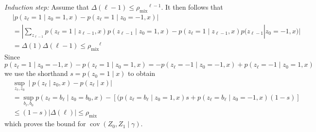 \documentclass[twoside,11pt]{article}
\DeclareMathOperator{\cov}{cov}
\newcommand{\mixcoef}{\ensuremath{\rho_{\mathrm{mix}}}}
\newcommand{\paramgamma}{\gamma}
\newcommand{\condcov}[3]{\cov(#1, #2 \mid #3)}
\begin{document}
\emph{Induction step:} Assume that $\Delta(\ell-1) \leq \mixcoef^{\ell-1}$.  
It then follows that
\begin{align*}
&|p(z_{\ell}=1 \mid z_0=1,x) - p(z_{\ell}=1 \mid z_0=-1,x)| \\ 
%
& = |\sum_{z_{\ell-1}} p(z_{\ell}
  =1 \mid z_{\ell-1},x)p(z_{\ell-1} \mid z_0=1,x) - 
  p(z_{\ell}=1 \mid z_{\ell-1},x)p(z_{\ell-1}|z_0
  =-1,x)| \\ 
%
&= \Delta(1) \Delta(\ell-1) \leq \mixcoef^{\ell}
%
\end{align*}
Since 
\begin{equation*}
p(z_{\ell} = 1 \mid z_{0}= -1,x) - p(z_{\ell}=1 \mid z_{0}=
  1,x) = - p(z_{\ell} = -1 \mid z_{0}= -1,x) + p(z_{\ell}= -1 \mid z_{0}=
  1,x)
\end{equation*}
we use the shorthand $s = p(z_0 = 1 \mid x)$ to obtain
\begin{align*}
&\sup_{z_{\ell},z_{0}} \mid p(z_{\ell} \mid z_{0},x) - p(z_{\ell} \mid x)| \\
%
& = \sup_{b_{\ell},b_{0}} p(z_{\ell}=b_{\ell} \mid z_{0}=b_{0},x) -
  [(p(z_{\ell}=b_{\ell} \mid z_{0}=1,x)s +
    p(z_{\ell}=b_{\ell} \mid z_{0}=-1,x)(1-s)] \\ 
%
%
&\leq (1-s) |\Delta(\ell)| \leq \mixcoef
%
\end{align*}
which proves the bound for $\condcov{Z_0}{Z_1}{\paramgamma}$.
\end{document}
